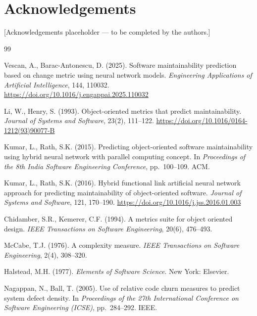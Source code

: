 \documentclass[11pt,a4paper]{article}
\newenvironment{acknowledgements}{%
  \section*{Acknowledgements}%
}{}
\begin{document}
\begin{acknowledgements}
[Acknowledgements placeholder — to be completed by the authors.]
\end{acknowledgements}

\begin{thebibliography}{99}

Vescan, A., Barac-Antonescu, D. (2025).
\newblock Software maintainability prediction based on change metric using
  neural network models.
\newblock \emph{Engineering Applications of Artificial Intelligence},
  144, 110032.
\newblock \url{https://doi.org/10.1016/j.engappai.2025.110032}

Li, W., Henry, S. (1993).
\newblock Object-oriented metrics that predict maintainability.
\newblock \emph{Journal of Systems and Software}, 23(2), 111--122.
\newblock \url{https://doi.org/10.1016/0164-1212(93)90077-B}

Kumar, L., Rath, S.K. (2015).
\newblock Predicting object-oriented software maintainability using hybrid
  neural network with parallel computing concept.
\newblock In \emph{Proceedings of the 8th India Software Engineering
  Conference}, pp.\ 100--109. ACM.

Kumar, L., Rath, S.K. (2016).
\newblock Hybrid functional link artificial neural network approach for
  predicting maintainability of object-oriented software.
\newblock \emph{Journal of Systems and Software}, 121, 170--190.
\newblock \url{https://doi.org/10.1016/j.jss.2016.01.003}

Chidamber, S.R., Kemerer, C.F. (1994).
\newblock A metrics suite for object oriented design.
\newblock \emph{IEEE Transactions on Software Engineering}, 20(6), 476--493.

McCabe, T.J. (1976).
\newblock A complexity measure.
\newblock \emph{IEEE Transactions on Software Engineering}, 2(4), 308--320.

Halstead, M.H. (1977).
\newblock \emph{Elements of Software Science}.
\newblock New York: Elsevier.

Nagappan, N., Ball, T. (2005).
\newblock Use of relative code churn measures to predict system defect density.
\newblock In \emph{Proceedings of the 27th International Conference on Software
  Engineering (ICSE)}, pp.\ 284--292. IEEE.


\end{thebibliography}
\end{document}
